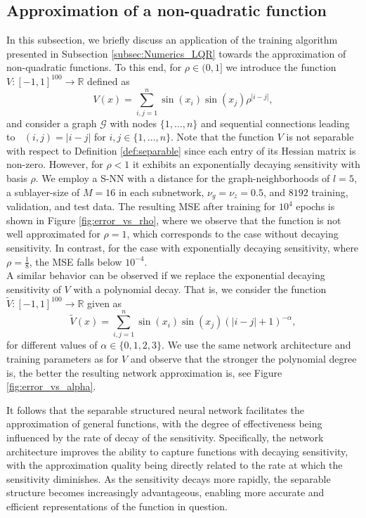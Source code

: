 \documentclass{article}
\newcommand{\R}{\mathbb{R}}
\DeclareMathOperator{\distG}{\operatorname{dist_\mathcal{G}}} %
\newcommand{\abs}[1]{\left\lvert {#1} \right\rvert}
\begin{document}
\subsection{Approximation of a non-quadratic function}
In this subsection, we briefly discuss an application of the training algorithm presented in Subsection \ref{subsec:Numerics_LQR} towards the approximation of non-quadratic functions. To this end, for $\rho \in (0,1]$ we introduce the function $V \colon [-1,1]^{100} \to \R$ defined as 
\begin{equation*}
    V(x) = \sum_{i, j=1}^n \sin(x_i) \sin(x_j) \rho^{\abs{i-j}},
\end{equation*}
and consider a graph $\mathcal{G}$ with nodes $\lbrace 1, \dots, n \rbrace$ and sequential connections leading to $\distG(i,j) = \abs{i-j}$ for $i,j \in \lbrace 1, \dots, n \rbrace$. Note that the function $V$ is not separable with respect to Definition \ref{def:separable} since each entry of its Hessian matrix is non-zero. However, for $\rho < 1$ it exhibits an exponentially decaying sensitivity with basis $\rho$. We employ a S-NN with a distance for the graph-neighborhoods of $l=5$, a sublayer-size of $M=16$ in each subnetwork, $\nu_g = \nu_z = 0.5$, and $8192$ training, validation, and test data. The resulting MSE after training for $10^4$ epochs is shown in Figure \ref{fig:error_vs_rho}, where we observe that the function is not well approximated for  $\rho = 1$, which corresponds to the case without decaying sensitivity. In contrast, for the case with exponentially decaying sensitivity, where $\rho = \frac{1}{8}$, the MSE falls below $10^{-4}$. \\ 
A similar behavior can be observed if we replace the exponential decaying sensitivity of $V$ with a polynomial decay. That is, we consider the function $\widetilde{V} \colon [-1,1]^{100} \to \R$ given as 
\begin{equation*}
    \widetilde{V}(x) = \sum_{i, j=1}^n \sin(x_i) \sin(x_j) (\abs{i-j}+1)^{-\alpha},
\end{equation*}
for different values of $\alpha \in \{ 0, 1, 2, 3\}$.  We use the same network architecture and training parameters as for $V$ and observe that the stronger the polynomial degree is, the better the resulting network approximation is, see Figure \ref{fig:error_vs_alpha}. 

It follows that the separable structured neural network facilitates the approximation of general functions, with the degree of effectiveness being influenced by the rate of decay of the sensitivity. Specifically, the network architecture improves the ability to capture functions with decaying sensitivity, with the approximation quality being directly related to the rate at which the sensitivity diminishes. As the sensitivity decays more rapidly, the separable structure becomes increasingly advantageous, enabling more accurate and efficient representations of the function in question.
\end{document}
